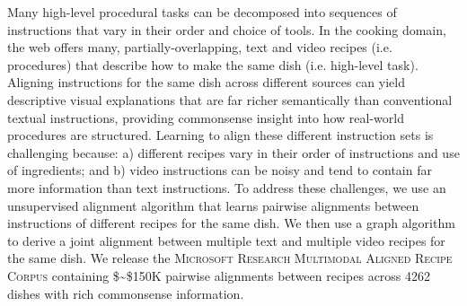Many high-level procedural tasks can be decomposed into sequences of instructions that vary in their order and choice of tools. In the cooking  domain, the web offers many, partially-overlapping, text and video recipes (i.e. procedures) that describe how to make the same dish (i.e. high-level task). Aligning instructions for the same dish across different sources can yield descriptive visual explanations that are far richer semantically than conventional textual instructions, providing commonsense insight into how real-world procedures are structured. Learning to align these different instruction sets is challenging because: a) different recipes vary in their order of instructions and use of ingredients; and b) video instructions can be noisy and tend to contain far more information than text instructions. To address these challenges, we use an unsupervised alignment algorithm that learns pairwise alignments between instructions of different recipes for the same dish. We then use a graph algorithm to derive a joint alignment between multiple text and multiple video recipes for the same dish. We release the \textsc{Microsoft Research Multimodal Aligned Recipe Corpus} containing \$\sim\$150K pairwise alignments between recipes across 4262 dishes with rich commonsense information.
